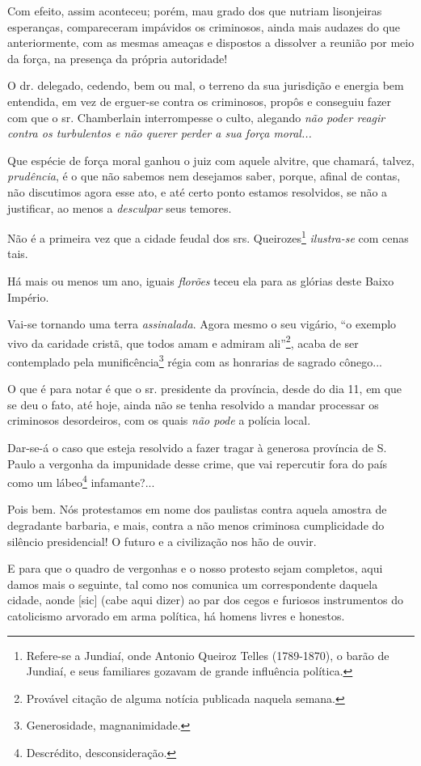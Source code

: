 Com efeito, assim aconteceu; porém, mau grado dos que nutriam
lisonjeiras esperanças, compareceram impávidos os criminosos, ainda mais
audazes do que anteriormente, com as mesmas ameaças e dispostos a
dissolver a reunião por meio da força, na presença da própria
autoridade!

O dr. delegado, cedendo, bem ou mal, o terreno da sua jurisdição e
energia bem entendida, em vez de erguer-se contra os criminosos, propôs
e conseguiu fazer com que o sr. Chamberlain interrompesse o culto,
alegando \emph{não poder reagir contra os turbulentos e não querer
perder a sua força moral...}

Que espécie de força moral ganhou o juiz com aquele alvitre, que
chamará, talvez, \emph{prudência}, é o que não sabemos nem desejamos
saber, porque, afinal de contas, não discutimos agora esse ato, e até
certo ponto estamos resolvidos, se não a justificar, ao menos a
\emph{desculpar} seus temores.

Não é a primeira vez que a cidade feudal dos srs. Queirozes\footnote{
  Refere-se a Jundiaí, onde Antonio Queiroz Telles (1789-1870), o barão
  de Jundiaí, e seus familiares gozavam de grande influência política.}
\emph{ilustra-se} com cenas tais.

Há mais ou menos um ano, iguais \emph{florões} teceu ela para as glórias
deste Baixo Império.

Vai-se tornando uma terra \emph{assinalada}. Agora mesmo o seu vigário,
``o exemplo vivo da caridade cristã, que todos amam e admiram
ali''\footnote{Provável citação de alguma notícia publicada naquela
  semana.}, acaba de ser contemplado pela munificência\footnote{
  Generosidade, magnanimidade.} régia com as honrarias de sagrado
cônego...

O que é para notar é que o sr. presidente da província, desde do dia 11,
em que se deu o fato, até hoje, ainda não se tenha resolvido a mandar
processar os criminosos desordeiros, com os quais \emph{não pode} a
polícia local.

Dar-se-á o caso que esteja resolvido a fazer tragar à generosa província
de S. Paulo a vergonha da impunidade desse crime, que vai repercutir
fora do país como um lábeo\footnote{Descrédito, desconsideração.}
infamante?...

Pois bem. Nós protestamos em nome dos paulistas contra aquela amostra de
degradante barbaria, e mais, contra a não menos criminosa cumplicidade
do silêncio presidencial! O futuro e a civilização nos hão de ouvir.

E para que o quadro de vergonhas e o nosso protesto sejam completos,
aqui damos mais o seguinte, tal como nos comunica um correspondente
daquela cidade, aonde {[}sic{]} (cabe aqui dizer) ao par dos cegos e
furiosos instrumentos do catolicismo arvorado em arma política, há
homens livres e honestos.

